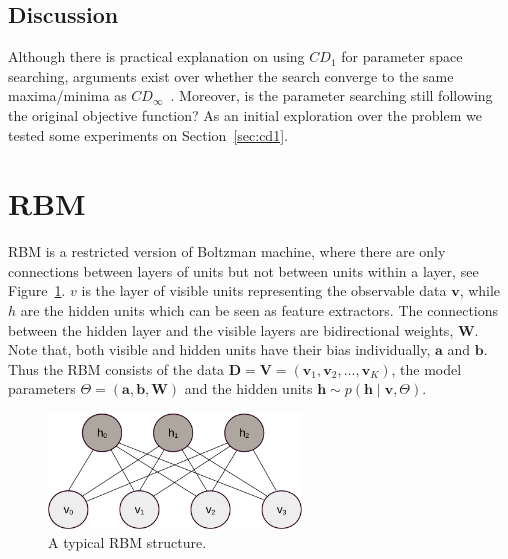 	\subsection{Discussion}
		Although there is practical explanation on using $CD_1$ for parameter space searching, arguments exist over whether the search converge to the same maxima/minima as $CD_\infty$~\cite{wu2015bias}.
		Moreover, is the parameter searching still following the original objective function?	
		As an initial exploration over the problem we tested some experiments on Section~\ref{sec:cd1}. 
\section{RBM\cite{zhang2013rbm}}
	RBM is a restricted version of Boltzman machine, where there are only connections between layers of units but not between units within a layer, see Figure~\ref{fig:RBM}.
	$ v $ is the layer of visible units representing the observable data $ \mathbf{v} $, while $ h $ are the hidden units which can be seen as feature extractors.
	The connections between the hidden layer and the visible layers are bidirectional weights, $ \mathbf{W} $.
	Note that, both visible and hidden units have their bias individually, $ \mathbf{a} $ and $ \mathbf{b} $.
	Thus the RBM consists of the data $ \mathbf{D} = \mathbf{V} = (\mathbf{v}_1, \mathbf{v}_2, ..., \mathbf{v}_K ) $, the model parameters $ \Theta = (\mathbf{a}, \mathbf{b}, \mathbf{W}) $ and the hidden units $ \mathbf{h} \sim p(\mathbf{h} \mid \mathbf{v}, \Theta) $.
	\begin{figure}[hbt]
	\centering
		\includegraphics[width=0.6\textwidth]{pics_sdbn/RBM.pdf}
		\caption{A typical RBM structure.}
		\label{fig:RBM}
	\end{figure}
	

